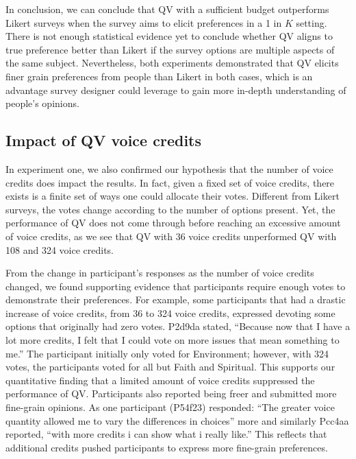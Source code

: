 In conclusion,
we can conclude that QV with a sufficient budget outperforms Likert surveys when the survey aims to elicit preferences in a 1 in $K$ setting.
There is not enough statistical evidence yet to conclude whether QV aligns to true preference better than Likert if the survey options are multiple aspects of the same subject. Nevertheless, both experiments demonstrated that QV elicits finer grain preferences from people than Likert in both cases, which is an advantage survey designer could leverage to gain more in-depth understanding of people's opinions.

\subsection{Impact of QV voice credits}
In experiment one, we also confirmed our hypothesis that the number of voice credits does impact the results. 
In fact, given a fixed set of voice credits, there exists is a finite set of ways one could allocate their votes. 
Different from Likert surveys, the votes change according to the number of options present.
Yet, the performance of QV does not come through before reaching an excessive amount of voice credits, as we see that QV with 36 voice credits unperformed QV with 108 and 324 voice credits.

From the change in participant's responses as the number of voice credits changed, we found supporting evidence that participants require enough votes to demonstrate their preferences.
For example, some participants that had a drastic increase of voice credits, from 36 to 324 voice credits, expressed devoting some options that originally had zero votes. 
P2d9da stated, ``Because now that I have a lot more credits, I felt that I could vote on more issues that mean something to me.'' The participant initially only voted for Environment; however, with 324 votes, the participants voted for all but Faith and Spiritual. This supports our quantitative finding that a limited amount of voice credits suppressed the performance of QV. Participants also reported being freer and submitted more fine-grain opinions. As one participant (P54f23) responded: ``The greater voice quantity allowed me to vary the differences in choices'' more and similarly Pcc4aa reported, ``with more credits i can show what i really like.''
This reflects that additional credits pushed participants to express more fine-grain preferences.

